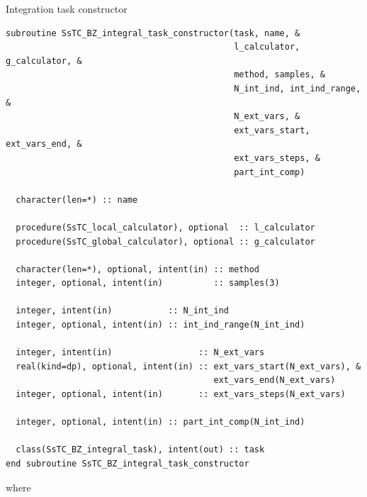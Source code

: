 \documentclass[10pt,a4paper]{article}
\begin{document}
\begin{codebox}{Integration task constructor}
\begin{lstlisting}[caption={Interface of the integrator task constructor.},captionpos=b]
subroutine SsTC_BZ_integral_task_constructor(task, name, &
                                             l_calculator, g_calculator, &
                                             method, samples, &
                                             N_int_ind, int_ind_range, &
                                             N_ext_vars, &
                                             ext_vars_start, ext_vars_end, &
                                             ext_vars_steps, &
                                             part_int_comp)

  character(len=*) :: name

  procedure(SsTC_local_calculator), optional  :: l_calculator
  procedure(SsTC_global_calculator), optional :: g_calculator

  character(len=*), optional, intent(in) :: method
  integer, optional, intent(in)          :: samples(3)

  integer, intent(in)           :: N_int_ind
  integer, optional, intent(in) :: int_ind_range(N_int_ind)

  integer, intent(in)                 :: N_ext_vars
  real(kind=dp), optional, intent(in) :: ext_vars_start(N_ext_vars), &
                                         ext_vars_end(N_ext_vars)
  integer, optional, intent(in)       :: ext_vars_steps(N_ext_vars)

  integer, optional, intent(in) :: part_int_comp(N_int_ind)

  class(SsTC_BZ_integral_task), intent(out) :: task
end subroutine SsTC_BZ_integral_task_constructor
\end{lstlisting}
\end{codebox}
where
\end{document}
